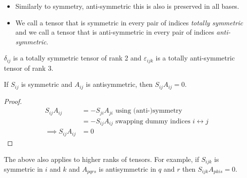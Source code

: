 \documentclass[../main.tex]{subfiles}
\begin{document}
\begin{remark}[Remarks]
  \begin{itemize}
    \item Similarly to symmetry, anti-symmetric this is also is preserved in all bases.
    \item We call a tensor that is symmetric in every pair of indices \textit{totally symmetric} and we call a tensor that is anti-symmetric in every pair of indices \textit{anti-symmetric}.
  \end{itemize}
\end{remark}
\begin{example}
  $\delta_{i j}$ is a totally symmetric tensor of rank 2 and $\varepsilon_{i j k}$ is a totally anti-symmetric tensor of rank 3.
\end{example}
\begin{lemma}
  If $S_{i j}$ is symmetric and $A_{i j}$ is antisymmetric, then $S_{i j}A_{i j} = 0$. \label{ASProd}
\end{lemma}
\begin{proof}
  \begin{align*}
    S_{i j}A_{i j} &= -S_{j i}A_{j i} \text{ using (anti-)symmetry}\\
                   &= -S_{i j}A_{i j} \text{ swapping dummy indices $i \leftrightarrow j$}\\
    \implies S_{i j}A_{i j} &= 0
  \end{align*}
\end{proof}
The above also applies to higher ranks of tensors.
For example, if $S_{i j k}$ is symmetric in $i$ and $k$ and $A_{pqrs}$ is antisymmetric in $q$ and $r$ then $S_{ijk}A_{pkis} = 0$.
\end{document}
